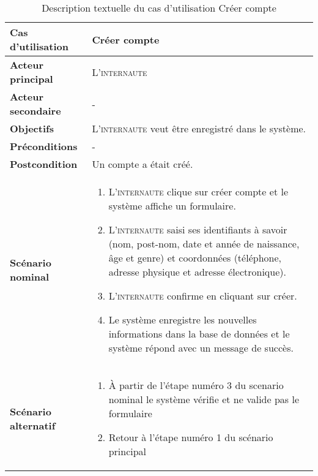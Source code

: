             \begin{longtable}{p{4cm} p{9cm}}
                \caption{Description textuelle du cas d’utilisation Créer compte}
                \label{table:usecaseCreeCompte}
                \\\hline\hline
                    \textbf{Cas d’utilisation} & \textbf{Créer compte}
                \\\hline\hline
                        \textbf{Acteur principal} & L’\textsc{internaute}
                    \\
                        \textbf{Acteur secondaire} & -
                    \\
                        \textbf{Objectifs} & L’\textsc{internaute} veut être 
                        enregistré dans le système.
                    \\
                        \textbf{Préconditions} & -
                    \\
                        \textbf{Postcondition} & Un compte a était créé.
                    \\
                        \textbf{Scénario nominal} &
                            \begin{enumerate}[leftmargin=*]
                                \item L’\textsc{internaute} clique sur créer compte et le
                                système affiche un formulaire.
                                \item L’\textsc{internaute} saisi ses identifiants à savoir
                                (nom, post-nom, date et année de
                                naissance, âge et genre) et coordonnées (téléphone, adresse physique
                                et adresse électronique).
                                \item L’\textsc{internaute} confirme en cliquant sur créer.
                                \item Le système enregistre les nouvelles informations
                                dans la base de données et le
                                système répond avec un message de succès.
                            \end{enumerate}
                    \\
                        \textbf{Scénario alternatif} &
                            \begin{enumerate}[leftmargin=*]
                                \item À partir de l’étape numéro 3 du scenario nominal
                                le système vérifie et ne valide pas le formulaire
                                \item Retour à l’étape numéro 1 du scénario principal
                            \end{enumerate}
                \\\bottomrule
            \end{longtable}

